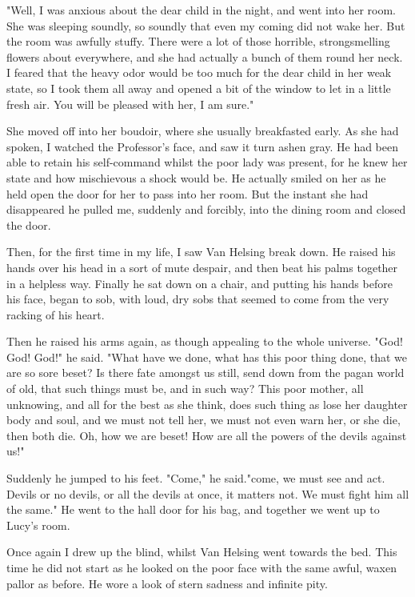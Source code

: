 "Well, I was anxious about the dear child in the night, and went into her room. She was sleeping soundly, so soundly that even my coming did not wake her. But the room was awfully stuffy. There were a lot of those horrible, strongsmelling flowers about everywhere, and she had actually a bunch of them round her neck. I feared that the heavy odor would be too much for the dear child in her weak state, so I took them all away and opened a bit of the window to let in a little fresh air. You will be pleased with her, I am sure." 

She moved off into her boudoir, where she usually breakfasted early. As she had spoken, I watched the Professor's face, and saw it turn ashen gray. He had been able to retain his self-command whilst the poor lady was present, for he knew her state and how mischievous a shock would be. He actually smiled on her as he held open the door for her to pass into her room. But the instant she had disappeared he pulled me, suddenly and forcibly, into the dining room and closed the door. 

Then, for the first time in my life, I saw Van Helsing break down. He raised his hands over his head in a sort of mute despair, and then beat his palms together in a helpless way. Finally he sat down on a chair, and putting his hands before his face, began to sob, with loud, dry sobs that seemed to come from the very racking of his heart. 

Then he raised his arms again, as though appealing to the whole universe. "God! God! God!" he said. "What have we done, what has this poor thing done, that we are so sore beset? Is there fate amongst us still, send down from the pagan world of old, that such things must be, and in such way? This poor mother, all unknowing, and all for the best as she think, does such thing as lose her daughter body and soul, and we must not tell her, we must not even warn her, or she die, then both die. Oh, how we are beset! How are all the powers of the devils against us!" 

Suddenly he jumped to his feet. "Come," he said."come, we must see and act. Devils or no devils, or all the devils at once, it matters not. We must fight him all the same." He went to the hall door for his bag, and together we went up to Lucy's room. 

Once again I drew up the blind, whilst Van Helsing went towards the bed. This time he did not start as he looked on the poor face with the same awful, waxen pallor as before. He wore a look of stern sadness and infinite pity. 

